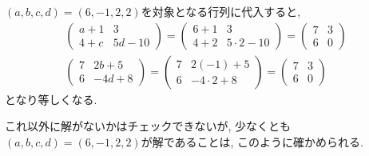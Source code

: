 \begin{checkanswer}%
  $(a,b,c,d)=(6,-1,2,2)$を対象となる行列に代入すると,
  \begin{align*}
    \begin{pmatrix}
      a+1& 3\\
      4+c &5d-10
    \end{pmatrix}
    =
    \begin{pmatrix}
      6+1& 3\\
      4+2 &5\cdot 2-10
    \end{pmatrix}
    =
    \begin{pmatrix}
      7& 3\\
      6&0
    \end{pmatrix}
    \\
    \begin{pmatrix}
      7& 2b+5\\
      6 &-4d+8
    \end{pmatrix}
=    \begin{pmatrix}
      7& 2(-1)+5\\
      6 &-4\cdot 2+8
    \end{pmatrix}
=    \begin{pmatrix}
      7& 3\\
      6 &0
    \end{pmatrix}
  \end{align*}
  となり等しくなる.

  これ以外に解がないかはチェックできないが,
  少なくとも$(a,b,c,d)=(6,-1,2,2)$が解であることは,
  このように確かめられる.
\end{checkanswer}

